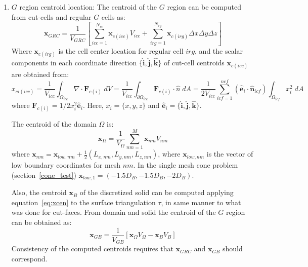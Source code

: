 \documentclass[11pt]{book}
\begin{document}
\begin{enumerate}
    \item $G$ region centroid location:
    The centroid of the $G$ region can be computed from cut-cells and regular $G$ cells as:
    \begin{equation}
       \mathbf{x}_{GRC} = \frac{1}{V_{GRC}}
       \left[  \sum_{icc=1}^{N_{cc}}{\mathbf{x}_{c(icc)}V_{icc}} +  \sum_{irg=1}^{N_{rg}}{\mathbf{x}_{c(irg)} \Delta x \Delta y \Delta z} \right]
    \end{equation}
    Where $\mathbf{x}_{c(irg)}$ is the cell center location for regular cell $irg$, and the scalar components in each coordinate direction  $\{\mathbf{\hat{i}},\mathbf{\hat{j}},\mathbf{\hat{k}}\}$ of cut-cell centroids $\mathbf{x}_{c(icc)}$ are obtained from:
    \begin{equation}
    x_{ci(icc)} = \frac{1}{V_{icc}} \int_{\Omega _{icc}} \nabla \cdot \mathbf{F}_{c(i)} \; dV =
    \frac{1}{V_{icc}} \int_{\partial \Omega _{icc}} \mathbf{F}_{c(i)} \cdot \hat{n} \; dA =
  \frac{1}{2V_{icc}} \sum_{icf=1}^{ncf} (\mathbf{\hat{e}}_i \cdot \mathbf{\hat{n}}_{icf}) \int_{\Omega _{icf}} x_i^2 \; dA
    \label{eq:xcen}
    \end{equation}
    where $\mathbf{F}_{c(i)}=1/2 x_i^2 \mathbf{\hat{e}}_i$. Here, $x_i=\{x,y,z\}$ and $\mathbf{\hat{e}}_i=\{\mathbf{\hat{i}},\mathbf{\hat{j}},\mathbf{\hat{k}}\}$.

    The centroid of the domain $\Omega$ is:
    \begin{equation}
        \mathbf{x}_\Omega = \frac{1}{V_\Omega} \sum_{nm=1}^M  \mathbf{x}_{nm} V_{nm}
    \end{equation}
    where $\mathbf{x}_{nm}=\mathbf{x}_{low,nm}+\frac{1}{2} \left( L_{x,nm},L_{y,nm},L_{z,nm} \right)$, where $\mathbf{x}_{low,nm}$ is the vector of low boundary coordinates for mesh $nm$. In the single mesh cone problem (section~\ref{cone_test}) $\mathbf{x}_{low,1}= \left( -1.5D_B,-1.5D_B,-2D_B \right)$.

    Also, the centroid $\mathbf{x}_B$ of the discretized solid can be computed applying equation~\eqref{eq:xcen} to the surface triangulation $\tau$, in same manner to what was done for cut-faces. From domain and solid the centroid of the $G$ region can be obtained as:
    \begin{equation}
      \mathbf{x}_{GB}=\frac{1}{V_{GB}} \left[ \mathbf{x}_\Omega V_\Omega - \mathbf{x}_B V_B \right]
    \end{equation}
    Consistency of the computed centroids requires that $\mathbf{x}_{GRC}$ and $\mathbf{x}_{GB}$ should correspond.

\end{enumerate}

\fi
\end{document}
